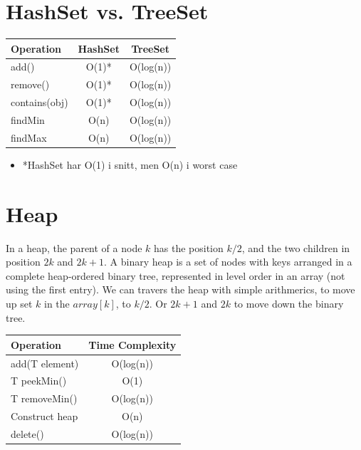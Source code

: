 \documentclass{article}
\begin{document}
\section{HashSet vs. TreeSet}
\begin{table}[!ht]
\centering
\begin{tabular}{|l|c|c|}
\hline
\textbf{Operation} & \textbf{HashSet} & \textbf{TreeSet} \\
\hline
add() & O(1)* & O(log(n)) \\
\hline
remove() & O(1)* & O(log(n)) \\
\hline
contains(obj) & O(1)* & O(log(n)) \\
\hline
findMin & O(n) & O(log(n))\\
\hline
findMax & O(n) & O(log(n))\\
\hline
\end{tabular}
\end{table}
\begin{itemize}
  \item *HashSet har O(1) i snitt, men O(n) i worst case
\end{itemize}



\section{Heap}
In a heap, the parent of a node $k$ has the position $k/2$, and the two children in position $2k$ and $2k+1$.
A binary heap is a set of nodes with keys arranged in a complete heap-ordered binary tree, represented in level order in an array (not using the first entry).
We can travers the heap with simple arithmerics, to move up set $k$ in the $array[k]$, to $k/2$. Or $2k+1$ and $2k$ to move down the binary tree. 

\begin{table}[!ht]
\centering
\begin{tabular}{|l|c|}
\hline
\textbf{Operation} & \textbf{Time Complexity} \\
\hline
add(T element) & O(log(n)) \\
\hline
T peekMin() & O(1) \\
\hline
T removeMin() & O(log(n)) \\
\hline
Construct heap & O(n) \\
\hline
delete() & O(log(n)) \\
\hline
\end{tabular}
\end{table}
\end{document}
